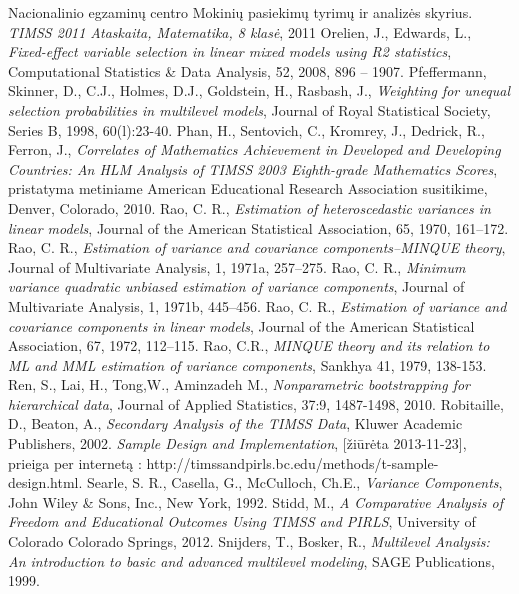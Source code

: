 \documentclass[12pt,a4paper]{article}
\begin{document}
\begin{thebibliography}{1}
 Nacionalinio egzaminų centro Mokinių pasiekimų tyrimų ir analizės skyrius. \textit{TIMSS 2011 Ataskaita, Matematika, 8 klasė}, 2011
 Orelien, J., Edwards, L., \textit{Fixed-effect variable selection in linear mixed models using R2 statistics}, Computational Statistics \& Data Analysis, 52, 2008, 896 – 1907.
 Pfeffermann, Skinner, D., C.J., Holmes, D.J., Goldstein, H., Rasbash, J., \textit{Weighting for unequal selection probabilities in multilevel models}, Journal of Royal Statistical Society, Series B, 1998, 60(l):23-40.
 Phan, H., Sentovich, C., Kromrey, J., Dedrick, R., Ferron, J., \textit{Correlates of Mathematics Achievement in Developed and Developing Countries: An HLM Analysis of TIMSS 2003 Eighth-grade Mathematics Scores}, pristatyma metiniame American Educational Research Association susitikime, Denver, Colorado, 2010.
Rao, C. R., \textit{Estimation of heteroscedastic variances in linear models}, Journal of the American Statistical Association, 65, 1970, 161–172.
 Rao, C. R., \textit{Estimation of variance and covariance components–MINQUE theory}, Journal of Multivariate Analysis, 1, 1971a, 257–275.
 Rao, C. R., \textit{Minimum variance quadratic unbiased estimation of variance components}, Journal of Multivariate Analysis, 1, 1971b, 445–456.
 Rao, C. R., \textit{Estimation of variance and covariance components in linear models}, Journal of the American Statistical Association, 67, 1972, 112–115.
 Rao, C.R., \textit{MINQUE theory and its relation to ML and MML estimation of variance components}, Sankhya 41, 1979, 138-153.
 Ren, S., Lai, H., Tong,W., Aminzadeh M., \textit{Nonparametric bootstrapping for hierarchical data}, Journal of Applied Statistics, 37:9, 1487-1498, 2010.
 Robitaille, D., Beaton, A., \textit{Secondary Analysis of the TIMSS Data}, Kluwer Academic Publishers, 2002.
 \textit{Sample Design and Implementation}, [žiūrėta 2013-11-23], prieiga per internetą : http://timssandpirls.bc.edu/methods/t-sample-design.html.
 Searle, S. R., Casella, G., McCulloch, Ch.E., \textit{Variance Components}, John Wiley \& Sons, Inc., New York, 1992.
 Stidd, M., \textit{A Comparative Analysis of Freedom and Educational Outcomes Using TIMSS and PIRLS}, University of Colorado Colorado Springs, 2012.
 Snijders, T., Bosker, R., \textit{Multilevel Analysis: An introduction to basic and advanced multilevel modeling}, SAGE Publications, 1999.

\end{thebibliography}
\end{document}
